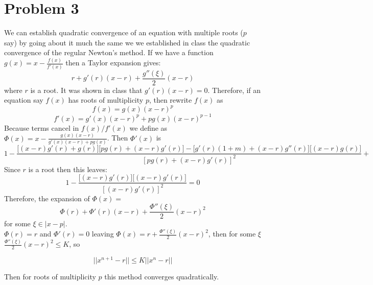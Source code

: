 \documentclass[]{article}
\begin{document}
\section*{Problem 3}
We can establish quadratic convergence of an equation with multiple roots ($ p $ say) by going about it much the same we we established in class the quadratic convergence of the regular Newton's method. If we have a function $ g(x) = x - \frac{f(x)}{f'(x)} $ then a Taylor expansion gives:
\[
 r + g'(r)(x-r) + \frac{g''(\xi)}{2} (x - r)
\]
where $ r$  is a root. It was shown in class that $ g'(r)(x-r) = 0  $. Therefore, if an equation say $ f(x) $ has roots of multiplicity $ p $, then rewrite $ f(x) $ as 
\begin{equation}
f(x) = g(x) (x-r)^p
\end{equation}
\begin{equation}
f'(x) = g'(x) (x-r)^{p} + pg(x)(x-r)^{p-1}
\end{equation}
Because terms cancel in $ f(x)/f'(x) $ we define as $ \Phi(x) = x - \frac{g(x) (x-r)}{g'(x) (x-r) + pg(x)}$. Then $ \Phi'(x) $ is 
\begin{equation}
1- \frac{\big[(x - r)g'(r) + g(r)\big]\big[pg(r) + (x-r)g'(r)\big] - \big[g'(r)(1+m) + (x-r)g''(r)\big]\big[(x-r)g(r)\big]}{[pg(r) + (x-r)g'(r)]^2} + 
\end{equation}
Since $ r   $ is a root then this leaves:
\begin{equation}
1- \frac{\big[(x - r)g'(r)\big]\big[(x-r)g'(r)\big] }{[ (x-r)g'(r)]^2} = 0
\end{equation}
Therefore, the expansion of $ \Phi(x) =  $
\begin{equation}
\Phi(r) + \Phi'(r)(x-r) + \frac{\Phi''(\xi)}{2}(x-r)^2
\end{equation}
for some $ \xi \in |x-p| $. \\
$ \Phi(r) = r$ and $ \Phi'(r) = 0 $ leaving $ \Phi(x) = r + \frac{\Phi''(\xi)}{2}(x-r)^2 $, then for some $ \xi $ $ \frac{\Phi''(\xi)}{2}(x-r)^2 \leq K$, so 

\begin{equation}
||x^{n+1} -r  || \leq K|| x^{n} - r ||
\end{equation}

Then for roots of multiplicity $ p $ this method converges quadratically. 
\end{document}
